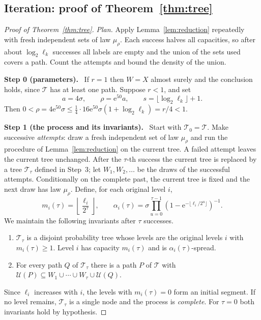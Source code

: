 \documentclass[11pt]{article}
\numberwithin{equation}{section}
\theoremstyle{remark}
\newcommand{\TT}{\mathcal T}
\newcommand{\UU}{\mathcal U}
\newcommand{\ee}{\mathrm e}
\newcommand{\step}[1]{\par\medskip\noindent\textbf{#1}\ }
\begin{document}
\subsection{Iteration: proof of Theorem~\ref{thm:tree}}

\begin{proof}[Proof of Theorem~\ref{thm:tree}]
\emph{Plan.} Apply Lemma~\ref{lem:reduction} repeatedly with fresh
independent sets of law $\mu_\rho$. Each success halves all capacities,
so after about $\log_2\ell_k$ successes all labels are empty and the
union of the sets used covers a path. Count the attempts and bound the
density of the union.

\step{Step 0 (parameters).} If $r=1$ then $W=X$ almost surely and the
conclusion holds, since $\TT$ has at least one path. Suppose $r<1$, and
set
\[
 a=4\sigma,\qquad \rho=\ee^{50}a,
 \qquad s=\lfloor\log_2\ell_k\rfloor+1.
\]
Then $0<\rho=4\ee^{50}\sigma\le\frac14\cdot16\ee^{50}\sigma(1+\log_2\ell_k)
=r/4<1$.

\step{Step 1 (the process and its invariants).} Start with $\TT_0=\TT$.
Make successive \emph{attempts}: draw a fresh independent set of law
$\mu_\rho$ and run the procedure of Lemma~\ref{lem:reduction} on the
current tree. A failed attempt leaves the current tree unchanged. After
the $\tau$-th success the current tree is replaced by a tree $\TT_\tau$
defined in Step~3; let $W_1,W_2,\ldots$ be the draws of the successful
attempts. Conditionally on the complete past, the current tree is fixed
and the next draw has law $\mu_\rho$. Define, for each original level
$i$,
\begin{equation}\label{eq:capacities}
 m_i(\tau)=\left\lfloor\frac{\ell_i}{2^\tau}\right\rfloor,
 \qquad
 \alpha_i(\tau)=\sigma
 \prod_{u=0}^{\tau-1}
 \left(1-\ee^{-\lfloor\ell_i/2^u\rfloor}\right)^{-1}.
\end{equation}
We maintain the following invariants after $\tau$ successes.
\begin{enumerate}[label=(I\arabic*),leftmargin=2.6em,itemsep=2pt]
 \item $\TT_\tau$ is a disjoint probability tree whose levels are the
 original levels $i$ with $m_i(\tau)\ge1$. Level $i$ has capacity
 $m_i(\tau)$ and is $\alpha_i(\tau)$-spread.
 \item For every path $Q$ of $\TT_\tau$ there is a path $P$ of $\TT$
 with $\UU(P)\subseteq W_1\cup\cdots\cup W_\tau\cup\UU(Q)$.
\end{enumerate}
Since $\ell_i$ increases with $i$, the levels with $m_i(\tau)=0$ form an
initial segment. If no level remains, $\TT_\tau$ is a single node and
the process is \emph{complete}. For $\tau=0$ both invariants hold by
hypothesis.


\end{proof}
\end{document}
